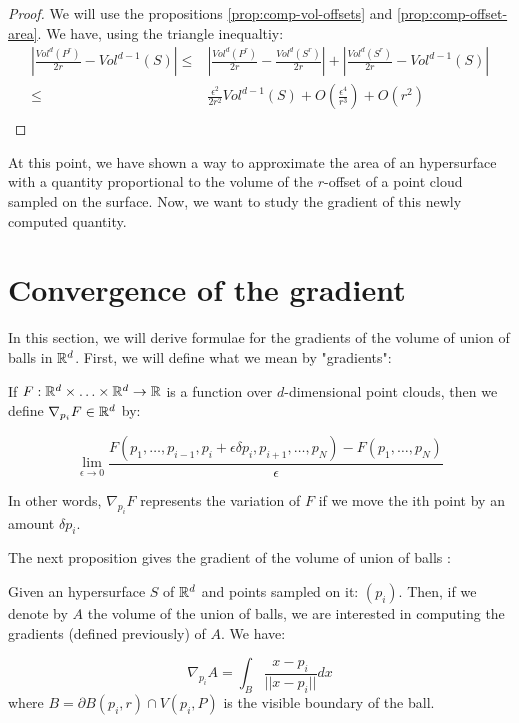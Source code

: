\begin{proof}
    We will use the propositions \ref{prop:comp-vol-offsets} and
    \ref{prop:comp-offset-area}. We have, using the triangle inequaltiy:
    \begin{align*}
        \left| \frac{Vol^d(P^r)}{2r} - Vol^{d-1}(S) \right| \leq& \left| \frac{Vol^d(P^r)}{2r} -
            \frac{Vol^d(S^r)}{2r} \right| + \left| \frac{Vol^d(S^r)}{2r} -
            Vol^{d-1}(S) \right| \\
        \leq& \frac{\epsilon^2}{2r^2} Vol^{d-1}(S) + O(\frac{\epsilon^4}{r^3}) + O(r^2) \\
    \end{align*}
\end{proof}

At this point, we have shown a way to approximate the area of an hypersurface
with a quantity proportional to the volume of the $r$-offset of a point cloud
sampled on the surface.
Now, we want to study the gradient of this newly computed quantity.

\section{Convergence of the gradient}

In this section, we will derive formulae for the gradients of the volume of
union of balls in $ \mathbb{R}^d $. First, we will define what we mean by "gradients":

\begin{definition}
    If $ F : \mathbb{R}^d \times \ldots \times \mathbb{R}^d \to \mathbb{R} $ is a function over
    $d$-dimensional point clouds, then we define $ \nabla_{p_i} F \in \mathbb{R}^d $ by:

    $$ \lim\limits_{\epsilon \to 0} \frac{F(p_1, \ldots, p_{i-1}, p_i + \epsilon
        \delta p_i, p_{i+1}, \ldots, p_N) - F(p_1, \ldots, p_N)}{\epsilon} $$

    In other words, $ \nabla_{p_i} F $ represents the variation of $ F $ if
    we move the ith point by an amount $ \delta p_i $.
\end{definition}

The next proposition gives the gradient of the volume of union of balls :
\begin{proposition}
    Given an hypersurface $ S $ of $ \mathbb{R}^d $ and points sampled on it: $ (p_i) $.
    Then, if we denote by $ A $ the volume of the union of balls, we are
    interested in computing the gradients (defined previously) of $ A $. We
    have:

    \begin{equation}
        \label{eqn:gradient_area_2d}
        \nabla_{p_i} A = \int_{B} \frac{x - p_i}{||x - p_i||} dx
    \end{equation}
    where $ B = \partial B(p_i, r) \cap V(p_i, P) $ is the visible boundary of
    the ball.
\end{proposition}


